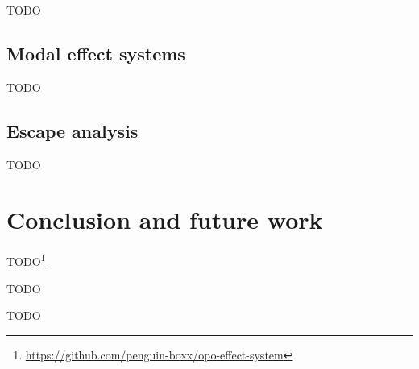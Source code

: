\documentclass[acmsmall,review,screen]{acmart}
\begin{document}
TODO %

\subsection{Modal effect systems} \label{subsec:overview-modal}

TODO %

\subsection{Escape analysis} \label{subsec:overview-escape-analysis}

TODO %





\section{Conclusion and future work} \label{sec:conclusion}



TODO\footnote{\url{https://github.com/penguin-boxx/opo-effect-system}}

TODO %


\begin{acks}
    TODO %
\end{acks}




\end{document}
